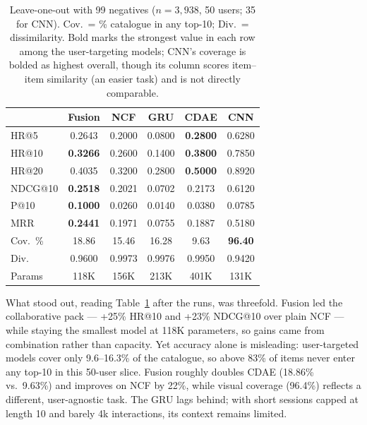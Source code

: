 \documentclass[conference]{IEEEtran}
\begin{document}
\begin{table}[t]
\centering
\footnotesize
\setlength{\tabcolsep}{2.6pt}
\renewcommand{\arraystretch}{1.0}
\begin{tabular}{@{}lccccc@{}}
\toprule
 & \textbf{Fusion} & \textbf{NCF} & \textbf{GRU} & \textbf{CDAE} & \textbf{CNN} \\
\midrule
HR@5    & 0.2643 & 0.2000 & 0.0800 & \textbf{0.2800} & 0.6280 \\
HR@10   & \textbf{0.3266} & 0.2600 & 0.1400 & \textbf{0.3800} & 0.7850 \\
HR@20   & 0.4035 & 0.3200 & 0.2800 & \textbf{0.5000} & 0.8920 \\
NDCG@10 & \textbf{0.2518} & 0.2021 & 0.0702 & 0.2173 & 0.6120 \\
P@10    & \textbf{0.1000} & 0.0260 & 0.0140 & 0.0380 & 0.0785 \\
MRR     & \textbf{0.2441} & 0.1971 & 0.0755 & 0.1887 & 0.5180 \\
Cov.\ \% & 18.86 & 15.46 & 16.28 & 9.63 & \textbf{96.40} \\
Div.    & 0.9600 & 0.9973 & 0.9976 & 0.9950 & 0.9420 \\
Params  & 118K & 156K & 213K & 401K & 131K \\
\bottomrule
\end{tabular}
\caption{Leave-one-out with 99 negatives ($n{=}3{,}938$, 50 users; 35 for CNN).
Cov.\ = \% catalogue in any top-10; Div.\ = dissimilarity.
Bold marks the strongest value in each row among the user-targeting models;
CNN's coverage is bolded as highest overall, though its column scores
item--item similarity (an easier task) and is not directly comparable.}
\label{tab:eval}
\end{table}

What stood out, reading Table~\ref{tab:eval} after the runs, was threefold. Fusion led
the collaborative pack --- +25\% HR@10 and +23\% NDCG@10 over plain NCF --- while
staying the smallest model at 118K parameters, so gains came from combination rather
than capacity. Yet accuracy alone is misleading: user-targeted models cover only
9.6--16.3\% of the catalogue, so above 83\% of items never enter any top-10 in this
50-user slice. Fusion roughly doubles CDAE (18.86\% vs.\ 9.63\%) and improves on NCF
by 22\%, while visual coverage (96.4\%) reflects a different, user-agnostic task.
The GRU lags behind; with short sessions capped at length 10 and barely 4k
interactions, its context remains limited.
\end{document}
